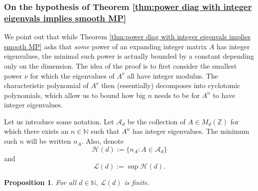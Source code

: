 \documentclass{article}
\def\N{\mathbb{N}}
\def\Z{\mathbb{Z}}
\newtheorem{proposition}[theorem]{Proposition}
\begin{document}
\subsubsection{On the hypothesis of Theorem \ref{thm:power diag with integer eigenvals implies smooth MP}}

We point out that while Theorem \ref{thm:power diag with integer eigenvals implies smooth MP} asks that \textit{some} power of an expanding integer matrix $A$ has integer eigenvalues, the minimal such power is actually bounded by a constant depending only on the dimension. The idea of the proof is to first consider the smallest power $\nu$ for which the eigenvalues of $A^\nu$ all have integer modulus. The characteristic polynomial of $A^\nu$ then (essentially) decomposes into cyclotomic polynomials, which allow us to bound how big $n$ needs to be for $A^n$ to have integer eigenvalues.



Let us introduce some notation. Let $\mathcal{A}_d$ be the collection of $A \in M_d(\Z)$ for which there exists an $n \in \N$ such that $A^n$ has integer eigenvalues. The minimum such $n$ will be written $n_A$. Also, denote $$\mathcal{H}(d):=\{n_A: A\in \mathcal{A}_d\}$$
and $$\mathcal{L}(d):= \sup \mathcal{H}(d).$$

\begin{proposition}\label{prop:bounded_power}
    For all $d\in \N$, $\mathcal{L}(d)$ is finite.
\end{proposition}
\end{document}
